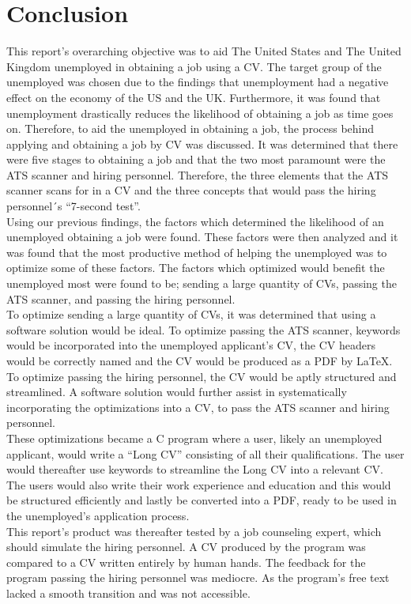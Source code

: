 \section{Conclusion}\label{sec:conclusion}
This report’s overarching objective was to aid The United States and The United Kingdom unemployed in obtaining a job using a CV. 
The target group of the unemployed was chosen due to the findings 
that unemployment had a negative effect on the economy of the US and the UK. 
Furthermore, it was found that unemployment drastically reduces the likelihood of obtaining a job as time goes on. 
Therefore, to aid the unemployed in obtaining a job, the process behind applying and obtaining a job by CV was discussed.  
It was determined that there were five stages to obtaining a job 
and that the two most paramount were the ATS scanner and hiring personnel. 
Therefore, the three elements that the ATS scanner scans for in a CV 
and the three concepts that would pass the hiring personnel´s “7-second test”. \\

Using our previous findings, the factors which determined the likelihood of an unemployed obtaining a job were found. 
These factors were then analyzed and it was found 
that the most productive method of helping the unemployed was to optimize some of these factors.
The factors which optimized would benefit the unemployed most were found to be; sending a large quantity of CVs, 
passing the ATS scanner, and passing the hiring personnel. \\

To optimize sending a large quantity of CVs, it was determined that using a software solution would be ideal. 
To optimize passing the ATS scanner, keywords would be incorporated into the unemployed applicant’s CV, 
the CV headers would be correctly named and the CV would be produced as a PDF by LaTeX. To optimize passing the hiring personnel, 
the CV would be aptly structured and streamlined. 
A software solution would further assist in systematically incorporating the optimizations into a CV, 
to pass the ATS scanner and hiring personnel. \\

These optimizations became a C program where a user, likely an unemployed applicant, 
would write a “Long CV” consisting of all their qualifications. 
The user would thereafter use keywords to streamline the Long CV into a relevant CV. 
The users would also write their work experience and education 
and this would be structured efficiently and lastly be converted into a PDF, 
ready to be used in the unemployed's application process. \\

This report’s product was thereafter tested by a job counseling expert, which should simulate the hiring personnel. 
A CV produced by the program was compared to a CV written entirely by human hands. 
The feedback for the program passing the hiring personnel was mediocre. 
As the program’s free text lacked a smooth transition and was not accessible.

\clearpage